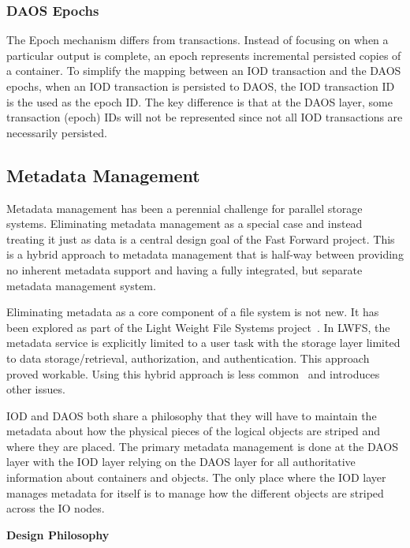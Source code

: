 \documentclass[conference]{IEEEtran}
\begin{document}
\subsubsection{DAOS Epochs}
The Epoch mechanism differs from transactions. Instead of focusing on when a
particular output is complete, an epoch represents incremental persisted copies
of a container. To simplify the mapping between an IOD transaction and the DAOS
epochs, when an IOD transaction is persisted to DAOS, the IOD transaction ID is
the used as the epoch ID. The key difference is that at the DAOS layer, some
transaction (epoch) IDs will not be represented since not all IOD transactions
are necessarily persisted.

\subsection{Metadata Management}
Metadata management has been a perennial challenge for parallel storage
systems.  Eliminating metadata management as a special case and instead
treating it just as data is a central design goal of the Fast Forward project.
This is a hybrid approach to metadata management that is half-way between
providing no inherent metadata support and having a fully integrated, but
separate metadata management system.

Eliminating metadata as a core component of a file system is not new. It has
been explored as part of the Light Weight File Systems
project~\cite{oldfield:lwfs}. In LWFS, the metadata service is explicitly
limited to a user task with the storage layer limited to data
storage/retrieval, authorization, and authentication. This approach proved
workable. Using this hybrid approach is less common~\cite{weil:2006:ceph} and
introduces other issues.

IOD and DAOS both share a philosophy that they will have to maintain the
metadata about how the physical pieces of the logical objects are striped and
where they are placed. The primary metadata management is done at the DAOS
layer with the IOD layer relying on the DAOS layer for all authoritative
information about containers and objects. The only place where the IOD layer
manages metadata for itself is to manage how the different objects are striped
across the IO nodes.

\noindent\textbf{Design Philosophy}
\end{document}
